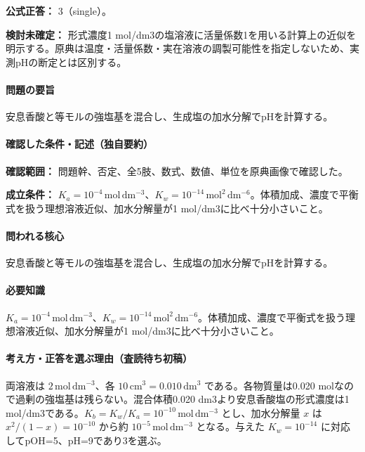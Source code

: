 \textbf{公式正答：} 3（single）。

\par\textbf{検討未確定：} 形式濃度1 mol/dm3の塩溶液に活量係数1を用いる計算上の近似を明示する。原典は温度・活量係数・実在溶液の調製可能性を指定しないため、実測pHの断定とは区別する。

\paragraph{問題の要旨} 安息香酸と等モルの強塩基を混合し、生成塩の加水分解でpHを計算する。

\paragraph{確認した条件・記述（独自要約）}\mbox{}\par

\noindent\textbf{確認範囲：} 問題幹、否定、全5肢、数式、数値、単位を原典画像で確認した。\par

\noindent\textbf{成立条件：} \(K_a=10^{-4}\,\mathrm{mol\,dm^{-3}}\)、\(K_w=10^{-14}\,\mathrm{mol^2\,dm^{-6}}\)。体積加成、濃度で平衡式を扱う理想溶液近似、加水分解量が1 mol/dm3に比べ十分小さいこと。\par

\paragraph{問われる核心} 安息香酸と等モルの強塩基を混合し、生成塩の加水分解でpHを計算する。

\paragraph{必要知識} \(K_a=10^{-4}\,\mathrm{mol\,dm^{-3}}\)、\(K_w=10^{-14}\,\mathrm{mol^2\,dm^{-6}}\)。体積加成、濃度で平衡式を扱う理想溶液近似、加水分解量が1 mol/dm3に比べ十分小さいこと。

\paragraph{考え方・正答を選ぶ理由（査読待ち初稿）} 両溶液は \(2\,\mathrm{mol\,dm^{-3}}\)、各 \(10\,\mathrm{cm^3}=0.010\,\mathrm{dm^3}\) である。各物質量は0.020 molなので過剰の強塩基は残らない。混合体積0.020 dm3より安息香酸塩の形式濃度は1 mol/dm3である。\(K_b=K_w/K_a=10^{-10}\,\mathrm{mol\,dm^{-3}}\) とし、加水分解量 \(x\) は \(x^2/(1-x)=10^{-10}\) から約 \(10^{-5}\,\mathrm{mol\,dm^{-3}}\) となる。与えた \(K_w=10^{-14}\) に対応してpOH=\allowbreak{}5、pH=\allowbreak{}9であり3を選ぶ。

